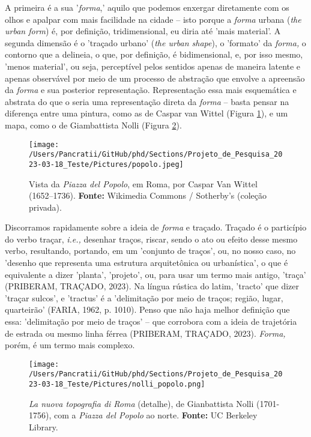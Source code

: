 \documentclass[]{report}
\begin{document}
	A primeira é a sua '\textit{forma},' aquilo que podemos enxergar diretamente com os olhos e apalpar com mais facilidade na cidade – isto porque a \textit{forma} urbana (\textit{the urban form}) é, por definição, tridimensional, eu diria até 'mais material'. A segunda dimensão é o 'traçado urbano' (\textit{the urban shape}), o 'formato' da \textit{forma,} o contorno que a delineia, o que, por definição, é bidimensional, e, por isso mesmo, 'menos material', ou seja, perceptível pelos sentidos apenas de maneira latente e apenas observável por meio de um processo de abstração que envolve a apreensão da \textit{forma} e sua posterior representação. Representação essa mais esquemática e abstrata do que o seria uma representação direta da \textit{forma} – basta pensar na diferença entre uma pintura, como as de Caspar van Wittel (Figura \ref{fig:popolo}), e um mapa, como o de Giambattista Nolli (Figura \ref{fig:nolli_popolo}).

\begin{figure}[h]
	\centering
	\texttt{[image: /Users/Pancratii/GitHub/phd/Sections/Projeto\_de\_Pesquisa\_2023-03-18\_Teste/Pictures/popolo.jpeg]} 
	\captionsetup{labelfont=bf}
	\caption{Vista da \textit{Piazza del Popolo}, em Roma, por Caspar Van Wittel (1652–1736). \textbf{Fonte:} Wikimedia Commons / Sotherby's (coleção privada).}
	\label{fig:popolo}
\end{figure}   

Discorramos rapidamente sobre a ideia de \textit{forma} e traçado. Traçado é o particípio do verbo traçar, \textit{i.e.,} desenhar traços, riscar, sendo o ato ou efeito desse mesmo verbo, resultando, portando, em um 'conjunto de traços', ou, no nosso caso, no 'desenho que representa uma estrutura arquitetônica ou urbanística', o que é equivalente a dizer 'planta', 'projeto', ou, para usar um termo mais antigo, 'traça' (PRIBERAM, TRAÇADO, 2023). Na língua rústica do latim, 'tracto' que dizer 'traçar sulcos', e 'tractus' é a 'delimitação por meio de traços; região, lugar, quarteirão' (FARIA, 1962, p. 1010). Penso que não haja melhor definição que essa: 'delimitação por meio de traços' – que corrobora com a ideia de trajetória de estrada ou mesmo linha férrea (PRIBERAM, TRAÇADO, 2023). \textit{Forma,} porém, é um termo mais complexo.

 \begin{figure}
	\centering
	\texttt{[image: /Users/Pancratii/GitHub/phd/Sections/Projeto\_de\_Pesquisa\_2023-03-18\_Teste/Pictures/nolli\_popolo.png]}
	\captionsetup{labelfont=bf}
	\caption{\textit{La nuova topografia di Roma} (detalhe), de Gianbattista Nolli (1701-1756), com a \textit{Piazza del Popolo} ao norte. \textbf{Fonte:} UC Berkeley Library.}
	\label{fig:nolli_popolo}
\end{figure} 
\end{document}
